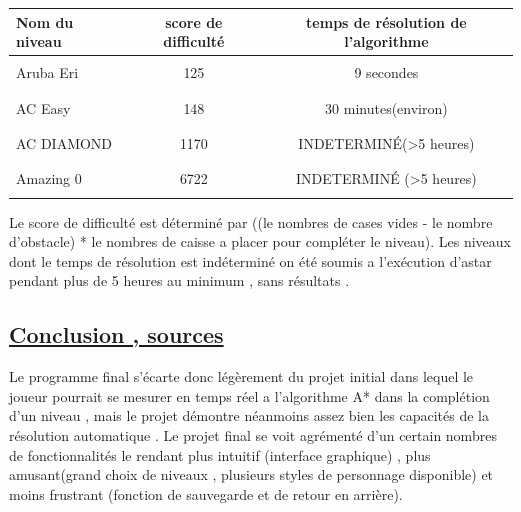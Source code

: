 \documentclass{article}
\begin{document}
\begin{tabular}{|l || c | c |}
\hline
  Nom du niveau & score de difficulté & temps de résolution de l'algorithme \\
 \hline
 \hline
 & &\\
 Aruba Eri & 125 & 9 secondes  \\
  & &\\
  \hline
  & &\\
 AC Easy& 148 & 30 minutes(environ) \\
  & &\\
  \hline
  & &\\
 AC DIAMOND& 1170 & INDETERMINÉ(>5 heures) \\
  & &\\
  \hline
  & &\\
 Amazing 0& 6722 & INDETERMINÉ (>5 heures)\\
  & &\\
 \hline
 \end{tabular}
\vspace{1cm}



Le score de difficulté est déterminé par ((le nombres de cases vides - le nombre d'obstacle) * le nombres de caisse a placer pour compléter le niveau). Les niveaux dont le temps de résolution est indéterminé on été soumis a l'exécution d'astar pendant plus de 5 heures au minimum , sans résultats .
\newpage
 
 
\begin{center}
\section{\underline{Conclusion , sources}}
\end{center}

\vspace{1cm}
Le programme final s'écarte donc légèrement du projet initial dans lequel le joueur pourrait se mesurer en temps réel a l'algorithme A* dans la complétion d'un niveau , mais le projet démontre néanmoins assez bien les capacités de la résolution automatique .
\newline
 Le projet final se voit agrémenté d'un certain nombres de fonctionnalités le rendant plus intuitif (interface graphique) , plus amusant(grand choix de niveaux , plusieurs styles de personnage disponible) et moins frustrant (fonction de sauvegarde et de retour en arrière).
\end{document}

